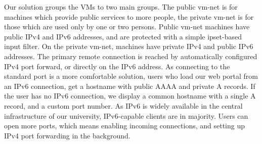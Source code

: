 \documentclass{llncs}
\begin{document}
Our solution groups the VMs to two main groups. The public vm-net is for machines which provide public services to more people, the private vm-net is for those which are used only by one or two persons. Public vm-net machines have public IPv4 and IPv6 addresses, and are protected with a simple ipset-based input filter. On the private vm-net, machines have private IPv4 and public IPv6 addresses. The primary remote connection is reached by automatically configured IPv4 port forward, or directly on the IPv6 address. As connecting to the standard port is a more comfortable solution, users who load our web portal from an IPv6 connection, get a hostname with public AAAA and private A records. If the user has no IPv6 connection, we display a common hostname with a single A record, and a custom port number. As IPv6 is widely available in the central infrastructure of our university, IPv6-capable clients are in majority. Users can open more ports, which means enabling incoming connections, and setting up IPv4 port forwarding in the background.
\end{document}
